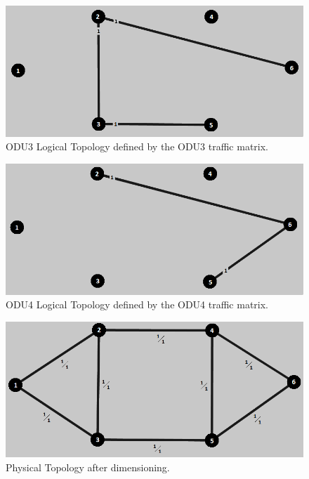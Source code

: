 \begin{figure}[H]
\centering
\includegraphics[width=13cm]{sdf/heuristic/transparent_protection/low/logical_topology_odu3_low}
\caption{ODU3 Logical Topology defined by the ODU3 traffic matrix.}
\label{logical_ODU3_protection_ref_low_heuristic_transparent}
\end{figure}

\begin{figure}[H]
\centering
\includegraphics[width=13cm]{sdf/heuristic/transparent_protection/low/logical_topology_odu4_low}
\caption{ODU4 Logical Topology defined by the ODU4 traffic matrix.}
\label{logical_ODU4_protection_ref_low_heuristic_transparent}
\end{figure}

\begin{figure}[H]
\centering
\includegraphics[width=13cm]{sdf/heuristic/transparent_protection/low/physical_topology_low}
\caption{Physical Topology after dimensioning.}
\label{physical_topology_protection_ref_low_heuristic_transparent}
\end{figure}

